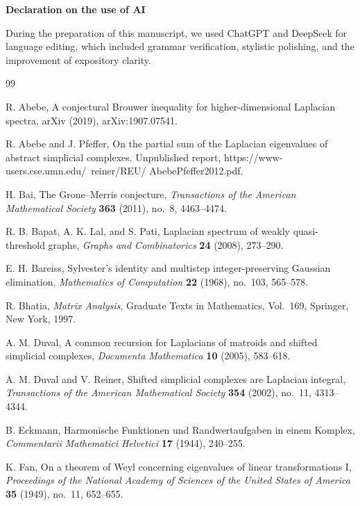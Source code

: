 \documentclass[11pt]{article}
\begin{document}
\newpage
 

{\bf Declaration on the use of AI}

During the preparation of this manuscript, we used ChatGPT and DeepSeek  for language editing,
which included grammar verification, stylistic polishing, and the improvement of expository clarity.
	
\begin{thebibliography}{99}

R. Abebe, A conjectural Brouwer inequality for higher-dimensional Laplacian spectra, arXiv
(2019),  arXiv:1907.07541.

R. Abebe and J. Pfeffer, On the partial sum of the Laplacian eigenvalues of abstract
simplicial complexes. Unpublished report, https://www-users.cse.umn.edu/~reiner/REU/
AbebePfeffer2012.pdf.

	H. Bai,
	\newblock The Grone--Merris conjecture,
	\newblock \emph{Transactions of the American Mathematical Society}
	\textbf{363} (2011), no.~8, 4463--4474.
	

	R. B. Bapat, A. K. Lal, and S. Pati,
	\newblock Laplacian spectrum of weakly quasi-threshold graphs,
	\newblock \emph{Graphs and Combinatorics} \textbf{24} (2008),
	273--290.

	E. H. Bareiss,
	\newblock Sylvester's identity and multistep integer-preserving Gaussian
	elimination,
	\newblock \emph{Mathematics of Computation} \textbf{22} (1968),
	no.~103, 565--578.

	R. Bhatia,
	\newblock \emph{Matrix Analysis},
	\newblock Graduate Texts in Mathematics, Vol.~169, Springer, New York,
	1997.

	A. M. Duval,
	\newblock A common recursion for Laplacians of matroids and shifted
	simplicial complexes,
	\newblock \emph{Documenta Mathematica} \textbf{10} (2005), 583--618.
	

	A. M. Duval and V. Reiner,
	\newblock Shifted simplicial complexes are Laplacian integral,
	\newblock \emph{Transactions of the American Mathematical Society}
	\textbf{354} (2002), no.~11, 4313--4344.
	

	B. Eckmann,
	\newblock Harmonische Funktionen und Randwertaufgaben in einem Komplex,
	\newblock \emph{Commentarii Mathematici Helvetici} \textbf{17}
	(1944), 240--255.
	
	K. Fan,
	\newblock On a theorem of Weyl concerning eigenvalues of linear
	transformations I,
	\newblock \emph{Proceedings of the National Academy of Sciences of the
	United States of America} \textbf{35} (1949), no.~11, 652--655.
	


\end{thebibliography}
\end{document}
